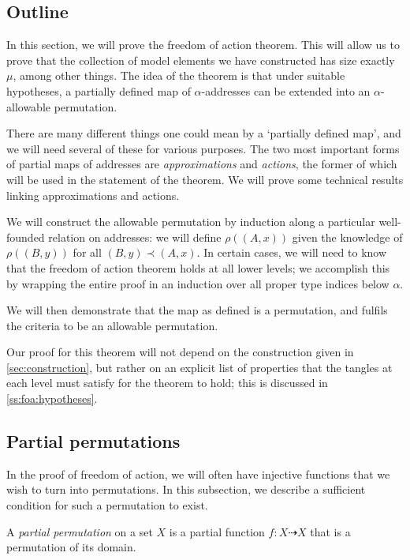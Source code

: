 \subsection{Outline}
\label{ss:foa:outline}

In this section, we will prove the freedom of action theorem.
This will allow us to prove that the collection of model elements we have constructed has size exactly \( \mu \), among other things.
The idea of the theorem is that under suitable hypotheses, a partially defined map of \( \alpha \)-addresses can be extended into an \( \alpha \)-allowable permutation.

There are many different things one could mean by a `partially defined map', and we will need several of these for various purposes.
The two most important forms of partial maps of addresses are \emph{approximations} and \emph{actions}, the former of which will be used in the statement of the theorem.
We will prove some technical results linking approximations and actions.

We will construct the allowable permutation by induction along a particular well-founded relation on addresses: we will define \( \rho((A, x)) \) given the knowledge of \( \rho((B, y)) \) for all \( (B, y) \prec (A, x) \).
In certain cases, we will need to know that the freedom of action theorem holds at all lower levels; we accomplish this by wrapping the entire proof in an induction over all proper type indices below \( \alpha \).

We will then demonstrate that the map as defined is a permutation, and fulfils the criteria to be an allowable permutation.

Our proof for this theorem will not depend on the construction given in \cref{sec:construction}, but rather on an explicit list of properties that the tangles at each level must satisfy for the theorem to hold; this is discussed in \cref{ss:foa:hypotheses}.

\subsection{Partial permutations}
\label{ss:foa:partial_perm}

In the proof of freedom of action, we will often have injective functions that we wish to turn into permutations.
In this subsection, we describe a sufficient condition for such a permutation to exist.

\begin{definition}
    A \emph{partial permutation} on a set \( X \) is a partial function \( f : X \rightdasharrow X \) that is a permutation of its domain.
\end{definition}

